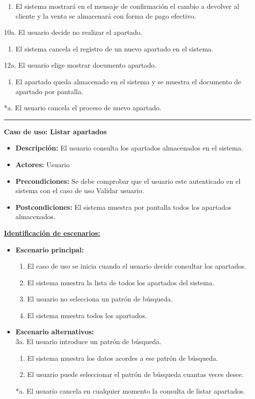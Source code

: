 \begin{itemize}
\begin{enumerate}
		 \item El sistema mostrará en el mensaje de confirmación el cambio a devolver al cliente y la venta se almacenará con forma de pago efectivo.
		\end{enumerate}
	 10a. El usuario decide no realizar el apartado.
	      \begin{enumerate}
	       \item El sistema cancela el registro de un nuevo apartado en el sistema.
	      \end{enumerate}
         12a. El usuario elige mostrar documento apartado.
	      \begin{enumerate}
	       \item El apartado queda almacenado en el sistema y se muestra el documento de apartado por pantalla.
	      \end{enumerate}
          *a. El usuario cancela el proceso de nuevo apartado.
\end{itemize}
\smallskip
\hrule height 1pt
\smallskip
\textbf{Caso de uso: Listar apartados}
\begin{itemize}\renewcommand{\labelitemi}{$\cdot$}
 \item \textbf{Descripción:} El usuario consulta los apartados almacenados en el sistema.
  \item \textbf{Actores:} Usuario
  \item \textbf{Precondiciones:} Se debe comprobar que el usuario este autenticado en el sistema con el caso de uso Validar usuario.
  \item \textbf{Postcondiciones:} El sistema muestra por pantalla todos los apartados almacenados.
\end{itemize}
\underline{\textbf{Identificación de escenarios:}}
\begin{itemize}\renewcommand{\labelitemi}{$\circ$}
 \item \textbf{Escenario principal:}
         \begin{enumerate}
          \item El caso de uso se inicia cuando el usuario decide consultar los apartados.
          \item El sistema muestra la lista de todos los apartados del sistema.
          \item El usuario no selecciona un patrón de búsqueda.
          \item El sistema muestra todos los apartados.
         \end{enumerate}
  \item \textbf{Escenario alternativos:}\\
  			3a. El usuario introduce un patrón de búsqueda.
  			\begin{enumerate}
  			\item El sistema muestra los datos acordes a ese patrón de búsqueda.
  			\item El usuario puede seleccionar el patrón de búsqueda cuantas veces desee.
  			\end{enumerate}
         *a. El usuario cancela en cualquier momento la consulta de listar apartados.
\end{itemize}
